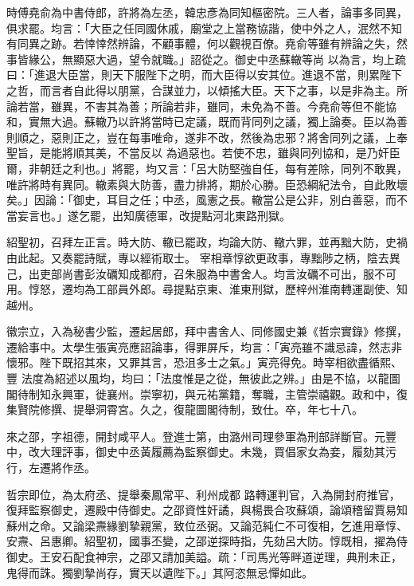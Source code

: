 \begin{pinyinscope}
 時傅堯俞為中書侍郎，許將為左丞，韓忠彥為同知樞密院。三人者，論事多同異，俱求罷。均言：「大臣之任同國休戚，廟堂之上當務協諧，使中外之人，泯然不知有同異之跡。若悻悻然辨論，不顧事體，何以觀視百僚。堯俞等雖有辨論之失，然事皆緣公，無顯惡大過，望令就職。」詔從之。御史中丞蘇轍等尚
 以為言，均上疏曰：「進退大臣當，則天下服陛下之明，而大臣得以安其位。進退不當，則累陛下之哲，而言者自此得以朋黨，合謀並力，以傾搖大臣。天下之事，以是非為主。所論若當，雖異，不害其為善；所論若非，雖同，未免為不善。今堯俞等但不能協和，實無大過。蘇轍乃以許將當時已定議，既而背同列之議，獨上論奏。臣以為善則順之，惡則正之，豈在每事唯命，遂非不改，然後為忠邪？將舍同列之議，上奉聖旨，是能將順其美，不當反以
 為過惡也。若使不忠，雖與同列協和，是乃奸臣爾，非朝廷之利也。」將罷，均又言：「呂大防堅強自任，每有差除，同列不敢異，唯許將時有異同。轍素與大防善，盡力排將，期於心勝。臣恐綱紀法令，自此敗壞矣。」因論：「御史，耳目之任；中丞，風憲之長。轍當公是公非，別白善惡，而不當妄言也。」遂乞罷，出知廣德軍，改提點河北東路刑獄。



 紹聖初，召拜左正言。時大防、轍已罷政，均論大防、轍六罪，並再黜大防，史禍由此起。又奏罷詩賦，專以經術取士。
 宰相章惇欲更政事，專黜陟之柄，陰去異己，出吏部尚書彭汝礪知成都府，召朱服為中書舍人。均言汝礪不可出，服不可用。惇怒，遷均為工部員外郎。尋提點京東、淮東刑獄，歷梓州淮南轉運副使、知越州。



 徽宗立，入為秘書少監，遷起居郎，拜中書舍人、同修國史兼《哲宗實錄》修撰，遷給事中。太學生張寅亮應詔論事，得罪屏斥，均言：「寅亮雖不識忌諱，然志非懷邪。陛下既招其來，又罪其言，恐沮多士之氣。」寅亮得免。時宰相欲盡循熙、豐
 法度為紹述以風均，均曰：「法度惟是之從，無彼此之辨。」由是不協，以龍圖閣待制知永興軍，徙襄州。崇寧初，與元祐黨籍，奪職，主管崇禧觀。政和中，復集賢院修撰、提舉洞霄宮。久之，復龍圖閣待制，致仕。卒，年七十八。



 來之邵，字祖德，開封咸平人。登進士第，由潞州司理參軍為刑部詳斷官。元豐中，改大理評事，御史中丞黃履薦為監察御史。未幾，買倡家女為妾，履劾其污行，左遷將作丞。



 哲宗即位，為太府丞、提舉秦鳳常平、利州成都
 路轉運判官，入為開封府推官，復拜監察御史，遷殿中侍御史。之邵資性奸譎，與楊畏合攻蘇頌，論頌稽留賈易知蘇州之命。又論梁燾緣劉摯親黨，致位丞弼。又論范純仁不可復相，乞進用章惇、安燾、呂惠卿。紹聖初，國事丕變，之邵逆探時指，先劾呂大防。惇既相，擢為侍御史。王安石配食神宗，之邵又請加美謚。疏：「司馬光等畔道逆理，典刑未正，鬼得而誅。獨劉摯尚存，實天以遺陛下。」其阿恣無忌憚如此。




\end{pinyinscope}
